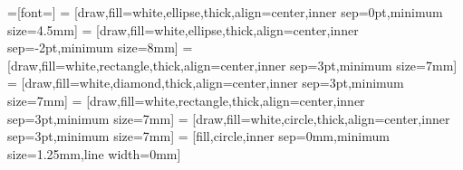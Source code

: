\usepackage[parts,pdfspacing]{classicthesis} 
\usepackage[T1]{fontenc}

\usepackage[spanish, es-tabla, es-noquoting]{babel}
\usepackage{amsmath,amsfonts,amsthm,amssymb,verbatim}
\usepackage{graphicx}
\usepackage{caption}
\usepackage{enumerate}
\usepackage{subcaption}
\usepackage{alltt}
\renewcommand{\ttdefault}{txtt}
\usepackage{mathrsfs}
\usepackage{stmaryrd}
\usepackage[shortlabels]{enumitem}
\usepackage{proof}
\usepackage{lscape}
\usepackage{booktabs}


\usepackage{tikz}
\usetikzlibrary{arrows,arrows.meta,calc,automata,positioning,decorations.pathreplacing,shapes.geometric,shapes.misc,graphs,backgrounds}
=[font=\scriptsize]
 = [draw,fill=white,ellipse,thick,align=center,inner sep=0pt,minimum size=4.5mm]
 = [draw,fill=white,ellipse,thick,align=center,inner sep=-2pt,minimum size=8mm]
 = [draw,fill=white,rectangle,thick,align=center,inner sep=3pt,minimum size=7mm]
 = [draw,fill=white,diamond,thick,align=center,inner sep=3pt,minimum size=7mm]
 = [draw,fill=white,rectangle,thick,align=center,inner sep=3pt,minimum size=7mm]
 = [draw,fill=white,circle,thick,align=center,inner sep=3pt,minimum size=7mm]
 = [fill,circle,inner sep=0mm,minimum size=1.25mm,line width=0mm]


\usepackage[T1]{fontenc}
\usepackage[colorinlistoftodos]{todonotes}

\usepackage{rotating}
\usepackage{microtype}
\usepackage{url}
\usepackage{hyperref}
\usepackage{wrapfig}
\usepackage{pgfplots}
\usepackage{multirow}
\usepackage{extarrows}
\usepackage{mathtools}
\usepackage[algoruled,vlined,linesnumbered]{algorithm2e}
\usepackage{algorithmic}
\usepackage{marginnote}

\usepackage[hyperpageref]{backref}
\usepackage{cite}

\setlength{\parskip}{.2cm}%

%

\usepackage{listings}

